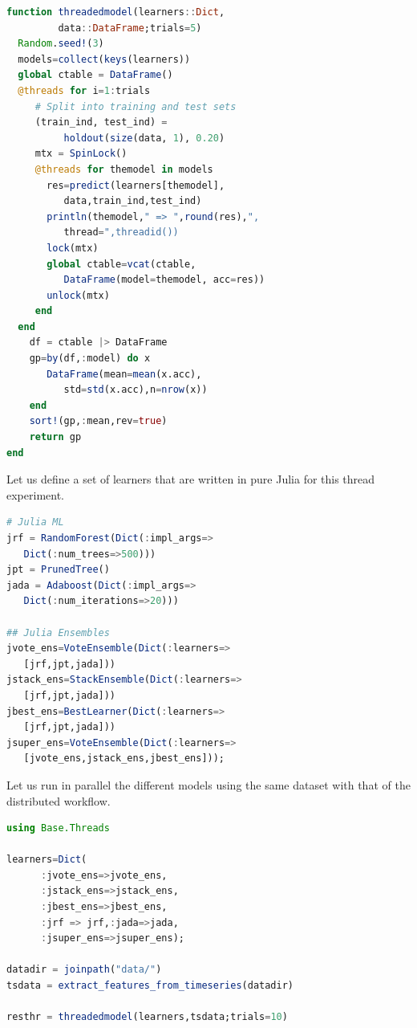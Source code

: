 \documentclass{juliacon}
\begin{document}
\begin{lstlisting}[language = Julia]
function threadedmodel(learners::Dict,
         data::DataFrame;trials=5)
  Random.seed!(3)
  models=collect(keys(learners))
  global ctable = DataFrame()
  @threads for i=1:trials
     # Split into training and test sets
     (train_ind, test_ind) = 
          holdout(size(data, 1), 0.20)
     mtx = SpinLock()
     @threads for themodel in models
       res=predict(learners[themodel],
          data,train_ind,test_ind)
       println(themodel," => ",round(res),", 
          thread=",threadid())
       lock(mtx)
       global ctable=vcat(ctable,
          DataFrame(model=themodel, acc=res))
       unlock(mtx)
     end
  end
    df = ctable |> DataFrame
    gp=by(df,:model) do x
       DataFrame(mean=mean(x.acc),
          std=std(x.acc),n=nrow(x))
    end
    sort!(gp,:mean,rev=true)
    return gp
end
\end{lstlisting}

Let us define a set of learners that are written in pure Julia for this thread experiment.

\begin{lstlisting}[language = Julia]
# Julia ML
jrf = RandomForest(Dict(:impl_args=>
   Dict(:num_trees=>500)))
jpt = PrunedTree()
jada = Adaboost(Dict(:impl_args=>
   Dict(:num_iterations=>20)))

## Julia Ensembles
jvote_ens=VoteEnsemble(Dict(:learners=>
   [jrf,jpt,jada]))
jstack_ens=StackEnsemble(Dict(:learners=>
   [jrf,jpt,jada]))
jbest_ens=BestLearner(Dict(:learners=>
   [jrf,jpt,jada]))
jsuper_ens=VoteEnsemble(Dict(:learners=>
   [jvote_ens,jstack_ens,jbest_ens]));
\end{lstlisting}

Let us run in parallel the different models using the same dataset with that of the distributed workflow.

\begin{lstlisting}[language = Julia]
using Base.Threads

learners=Dict(
      :jvote_ens=>jvote_ens,
      :jstack_ens=>jstack_ens,
      :jbest_ens=>jbest_ens,
      :jrf => jrf,:jada=>jada,
      :jsuper_ens=>jsuper_ens);
      
datadir = joinpath("data/")
tsdata = extract_features_from_timeseries(datadir)

resthr = threadedmodel(learners,tsdata;trials=10)
\end{lstlisting}
\end{document}
